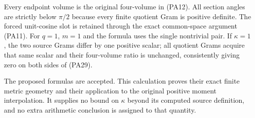 Every endpoint volume is the original four-volume in (PA12). All section angles are strictly below \(\pi/2\) because every finite quotient Gram is positive definite. The forced unit-cosine slot is retained through the exact common-space argument (PA11). For \(q=1\), \(m=1\) and the formula uses the single nontrivial pair. If \(\kappa=1\), the two source Grams differ by one positive scalar; all quotient Grams acquire that same scalar and their four-volume ratio is unchanged, consistently giving zero on both sides of (PA29).

The proposed formulas are accepted. This calculation proves their exact finite metric geometry and their application to the original positive moment interpolation. It supplies no bound on \(\kappa\) beyond its computed source definition, and no extra arithmetic conclusion is assigned to that quantity.
